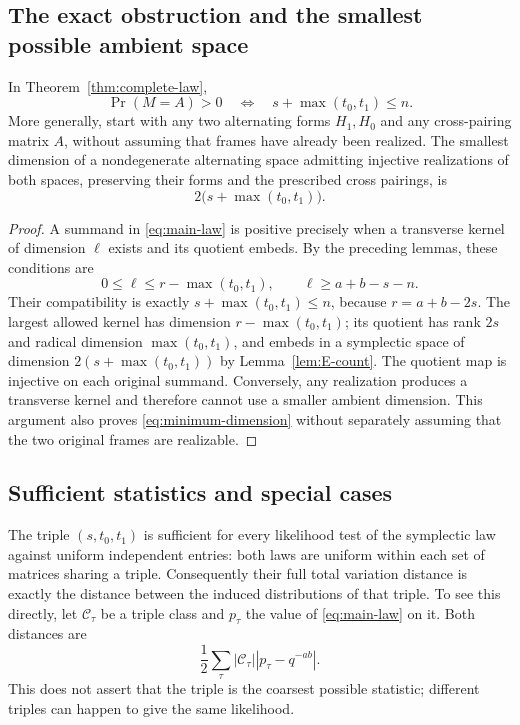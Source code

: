 \subsection{The exact obstruction and the smallest possible ambient space}

\begin{theorem}\label{thm:minimum-dimension}
In Theorem~\ref{thm:complete-law},
\begin{equation}\label{eq:support-criterion}
 \boxed{\quad\Pr(M=A)>0\quad\Longleftrightarrow\quad
 s+\max(t_0,t_1)\le n.\quad}
\end{equation}
More generally, start with any two alternating forms $H_1,H_0$ and
any cross-pairing matrix $A$, without assuming that frames have already
been realized. The smallest dimension of a nondegenerate alternating
space admitting injective realizations of both spaces, preserving
their forms and the prescribed cross pairings, is
\begin{equation}\label{eq:minimum-dimension}
 \boxed{\qquad 2\bigl(s+\max(t_0,t_1)\bigr).\qquad}
\end{equation}
\end{theorem}

\begin{proof}
A summand in \eqref{eq:main-law} is positive precisely when a
transverse kernel of dimension $\ell$ exists and its quotient embeds.
By the preceding lemmas, these conditions are
\[
 0\le\ell\le r-\max(t_0,t_1),\qquad
 \ell\ge a+b-s-n.
\]
Their compatibility is exactly $s+\max(t_0,t_1)\le n$, because
$r=a+b-2s$. The largest allowed kernel has dimension
$r-\max(t_0,t_1)$; its quotient has rank $2s$ and radical dimension
$\max(t_0,t_1)$, and embeds in a symplectic space of dimension
$2(s+\max(t_0,t_1))$ by Lemma~\ref{lem:E-count}.
The quotient map is injective on each original summand. Conversely,
any realization produces a transverse kernel and therefore cannot
use a smaller ambient dimension. This argument also proves
\eqref{eq:minimum-dimension} without separately assuming that the
two original frames are realizable.
\end{proof}

\subsection{Sufficient statistics and special cases}

The triple $(s,t_0,t_1)$ is sufficient for every likelihood test of
the symplectic law against uniform independent entries: both laws
are uniform within each set of matrices sharing a triple. Consequently
their full total variation distance is exactly the distance between
the induced distributions of that triple. To see this directly, let
$\mathcal C_\tau$ be a triple class and $p_\tau$ the value of
\eqref{eq:main-law} on it. Both distances are
\[
 \frac12\sum_\tau |\mathcal C_\tau|
 |p_\tau-q^{-ab}|.
\]
This does not assert that the triple is the coarsest possible statistic;
different triples can happen to give the same likelihood.

